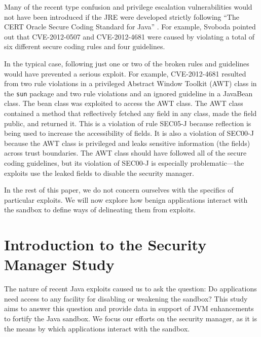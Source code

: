 \documentclass{sig-alternate}
\begin{document}
Many of the recent type confusion and privilege escalation vulnerabilities
would not have been introduced if the JRE were developed strictly
following ``The CERT Oracle Secure Coding Standard for Java'' \cite{long_cert_2011}.
For example, Svoboda \cite{svoboda_anatomy_blog_2013,svoboda_anatomy_2014}
pointed out that CVE-2012-0507 and CVE-2012-4681 were caused by violating
a total of six different secure coding rules and four guidelines. 

In the typical case, following just one or two of the broken rules
and guidelines would have prevented a serious exploit. For example,
CVE-2012-4681 resulted from two rule violations in a privileged Abstract
Window Toolkit (AWT) class in the \texttt{sun} package and two rule
violations and an ignored guideline in a JavaBean class. The bean
class was exploited to access the AWT class. The AWT class contained
a method that reflectively fetched any field in any class, made the
field public, and returned it. This is a violation of rule SEC05-J
because reflection is being used to increase the accessibility of
fields. It is also a violation of SEC00-J because the AWT class is
privileged and leaks sensitive information (the fields) across trust
boundaries. The AWT class should have followed all of the secure coding
guidelines, but its violation of SEC00-J is especially problematic---the
exploits use the leaked fields to disable the security manager. 

In the rest of this paper, we do not concern ourselves with the specifics
of particular exploits. We will now explore how benign applications interact with the sandbox to define ways of delineating them from exploits. 


\section{Introduction to the Security \\ Manager Study}\label{sec:Security-Manager-Study}

The nature of recent Java exploits caused us to ask the question: Do applications need access to any facility for disabling or weakening the sandbox? This study aims to answer this question and provide data in support of JVM enhancements to fortify the Java sandbox.
We focus our efforts on the security manager, as it is the means by
which applications interact with the sandbox. 
\end{document}
